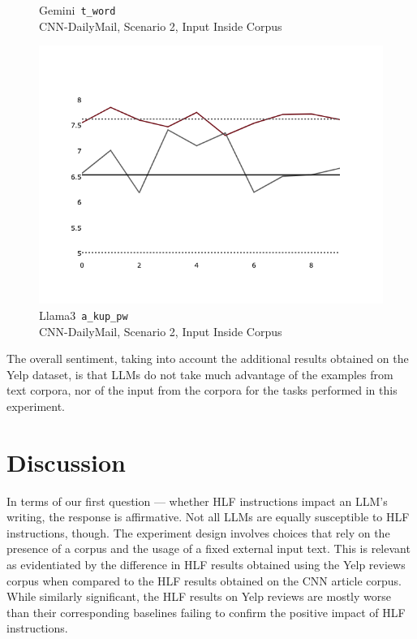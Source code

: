 \documentclass[a4paper,twoside]{article}
\begin{document}
\begin{figure}[ht!]
\begin{minipage}{0.32\textwidth}
        \caption{Gemini~\texttt{t\_word}\\CNN-DailyMail, Scenario 2, Input Inside Corpus}\label{fig-p2-ifd-gemini-twords}
    \end{minipage}
    \hfill
    \begin{minipage}{0.32\textwidth}
        \includegraphics[width=\linewidth]{plots/prompt_2_ifd/prompt_2-llama3_70b-cnn_dailymail/prompt_2-llama3_70b-cnn_dailymail_a_kup_pw.png}
        \caption[center]{Llama3~\texttt{a\_kup\_pw}\\CNN-DailyMail, Scenario 2, Input Inside Corpus}\label{fig-p2-ifd-llama3-a-kup-pw}
    \end{minipage}
\end{figure}

The overall sentiment, taking into account the additional results obtained on
the Yelp dataset, is that LLMs do not take much advantage of the examples
from text corpora, nor of the input from the corpora for the tasks performed in
this experiment.

\section{Discussion}

In terms of our first question --- whether HLF instructions impact an LLM's
writing, the response is affirmative.
Not all LLMs are equally susceptible to HLF instructions, though.
The experiment design involves choices that rely on the presence of a corpus and
the usage of a fixed external input text.
This is relevant as evidentiated by the difference in HLF results obtained using
the Yelp reviews corpus when compared to the HLF results obtained on the CNN
article corpus.
While similarly significant, the HLF results on Yelp reviews are mostly worse
than their corresponding baselines failing to confirm the positive impact of HLF
instructions.
\end{document}
